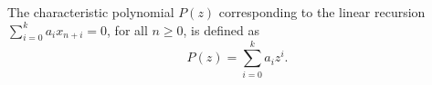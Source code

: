 \begin{definition}
    The characteristic polynomial \(P(z)\) corresponding to the linear recursion \(\sum_{i=0}^{k} a_i x_{n+i} = 0\), for all \(n \geq 0\), is defined as
    \begin{equation}
        P(z) = \sum_{i=0}^{k} a_i z^i.
    \end{equation}
\end{definition}
